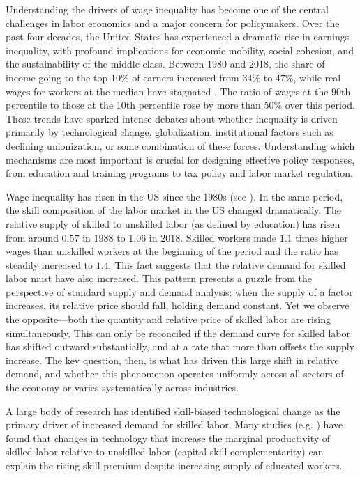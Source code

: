 \documentclass[12pt]{article}
\begin{document}
Understanding the drivers of wage inequality has become one of the central challenges in labor economics and a major concern for policymakers. Over the past four decades, the United States has experienced a dramatic rise in earnings inequality, with profound implications for economic mobility, social cohesion, and the sustainability of the middle class. Between 1980 and 2018, the share of income going to the top 10\% of earners increased from 34\% to 47\%, while real wages for workers at the median have stagnated \citep{piketty2014capital}. The ratio of wages at the 90th percentile to those at the 10th percentile rose by more than 50\% over this period. These trends have sparked intense debates about whether inequality is driven primarily by technological change, globalization, institutional factors such as declining unionization, or some combination of these forces. Understanding which mechanisms are most important is crucial for designing effective policy responses, from education and training programs to tax policy and labor market regulation.

Wage inequality has risen in the US since the 1980s (see \citet{acemoglu2011skills}). In the same period, the skill composition of the labor market in the US changed dramatically. The relative supply of skilled to unskilled labor (as defined by education) has risen from around $0.57$ in $1988$ to $1.06$ in $2018$. Skilled workers made $1.1$ times higher wages than unskilled workers at the beginning of the period and the ratio has steadily increased to $1.4$. This fact suggests that the relative demand for skilled labor must have also increased. This pattern presents a puzzle from the perspective of standard supply and demand analysis: when the supply of a factor increases, its relative price should fall, holding demand constant. Yet we observe the opposite---both the quantity and relative price of skilled labor are rising simultaneously. This can only be reconciled if the demand curve for skilled labor has shifted outward substantially, and at a rate that more than offsets the supply increase. The key question, then, is what has driven this large shift in relative demand, and whether this phenomenon operates uniformly across all sectors of the economy or varies systematically across industries.

A large body of research has identified skill-biased technological change as the primary driver of increased demand for skilled labor. Many studies (e.g. \citet{katz1992changes, krusell2000capital,card2002skill, acemoglu2002directed}) have found that changes in technology that increase the marginal productivity of skilled labor relative to unskilled labor (capital-skill complementarity) can explain the rising skill premium despite increasing supply of educated workers.
\end{document}
